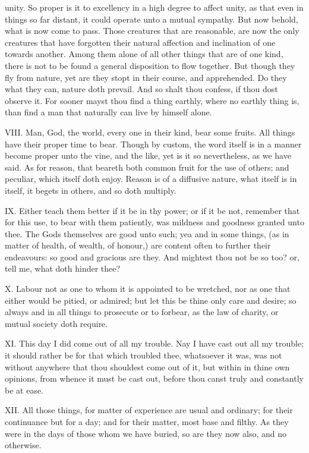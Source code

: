 unity. So proper is it to excellency in a high degree to affect unity, as
that even in things so far distant, it could operate unto a mutual
sympathy. But now behold, what is now come to pass. Those creatures that
are reasonable, are now the only creatures that have forgotten their
natural affection and inclination of one towards another. Among them alone
of all other things that are of one kind, there is not to be found a
general disposition to flow together. But though they fly from nature, yet
are they stopt in their course, and apprehended. Do they what they can,
nature doth prevail. And so shalt thou confess, if thou dost observe it.
For sooner mayst thou find a thing earthly, where no earthly thing is,
than find a man that naturally can live by himself alone.

VIII. Man, God, the world, every one in their kind, bear some fruits.
All things have their proper time to bear. Though by custom, the word
itself is in a manner become proper unto the vine, and the like, yet is it
so nevertheless, as we have said. As for reason, that beareth both common
fruit for the use of others; and peculiar, which itself doth enjoy. Reason
is of a diffusive nature, what itself is in itself, it begets in others,
and so doth multiply.

IX. Either teach them better if it be in thy power; or if it be not,
remember that for this use, to bear with them patiently, was mildness and
goodness granted unto thee. The Gods themselves are good unto such; yea
and in some things, (as in matter of health, of wealth, of honour,) are
content often to further their endeavours: so good and gracious are they.
And mightest thou not be so too? or, tell me, what doth hinder thee?

X. Labour not as one to whom it is appointed to be wretched, nor as one
that either would be pitied, or admired; but let this be thine only care
and desire; so always and in all things to prosecute or to forbear, as the
law of charity, or mutual society doth require.

XI. This day I did come out of all my trouble. Nay I have cast out all
my trouble; it should rather be for that which troubled thee, whatsoever
it was, was not without anywhere that thou shouldest come out of it, but
within in thine own opinions, from whence it must be cast out, before thou
canst truly and constantly be at ease.

XII. All those things, for matter of experience are usual and ordinary;
for their continuance but for a day; and for their matter, most base and
filthy. As they were in the days of those whom we have buried, so are they
now also, and no otherwise.


